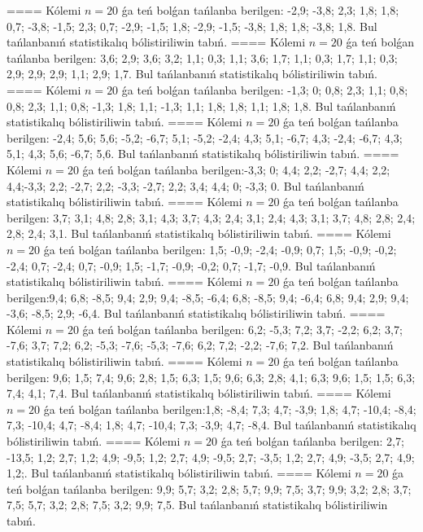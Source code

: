 ====
Kólemi \(n = 20\) ǵa teń bolǵan tańlanba berilgen: -2,9; -3,8; 2,3; 1,8; 1,8; 0,7; -3,8; -1,5; 2,3; 0,7; -2,9; -1,5; 1,8; -2,9; -1,5; -3,8; 1,8; 1,8; -3,8; 1,8. Bul tańlanbanıń statistikalıq bólistiriliwin tabıń.
====
Kólemi \(n = 20\) ǵa teń bolǵan tańlanba berilgen: 3,6; 2,9; 3,6; 3,2; 1,1; 0,3; 1,1; 3,6; 1,7; 1,1; 0,3; 1,7; 1,1; 0,3; 2,9; 2,9; 2,9; 1,1; 2,9; 1,7. Bul tańlanbanıń statistikalıq bólistiriliwin tabıń.
====
Kólemi \(n = 20\) ǵa teń bolǵan tańlanba berilgen: -1,3; 0; 0,8; 2,3; 1,1; 0,8; 0,8; 2,3; 1,1; 0,8; -1,3; 1,8; 1,1; -1,3; 1,1; 1,8; 1,8; 1,1; 1,8; 1,8. Bul tańlanbanıń statistikalıq bólistiriliwin tabıń.
====
Kólemi \(n = 20\) ǵa teń bolǵan tańlanba berilgen: -2,4; 5,6; 5,6; -5,2; -6,7; 5,1; -5,2; -2,4; 4,3; 5,1; -6,7; 4,3; -2,4; -6,7; 4,3; 5,1; 4,3; 5,6; -6,7; 5,6. Bul tańlanbanıń statistikalıq bólistiriliwin tabıń.
====
Kólemi \(n = 20\) ǵa teń bolǵan tańlanba berilgen:-3,3; 0; 4,4; 2,2; -2,7; 4,4; 2,2; 4,4;-3,3; 2,2; -2,7; 2,2; -3,3; -2,7; 2,2; 3,4; 4,4; 0; -3,3; 0. Bul tańlanbanıń statistikalıq bólistiriliwin tabıń.
====
Kólemi \(n = 20\) ǵa teń bolǵan tańlanba berilgen: 3,7; 3,1; 4,8; 2,8; 3,1; 4,3; 3,7; 4,3; 2,4; 3,1; 2,4; 4,3; 3,1; 3,7; 4,8; 2,8; 2,4; 2,8; 2,4; 3,1. Bul tańlanbanıń statistikalıq bólistiriliwin tabıń.
====
Kólemi \(n = 20\) ǵa teń bolǵan tańlanba berilgen: 1,5; -0,9; -2,4; -0,9; 0,7; 1,5; -0,9; -0,2; -2,4; 0,7; -2,4; 0,7; -0,9; 1,5; -1,7; -0,9; -0,2; 0,7; -1,7; -0,9. Bul tańlanbanıń statistikalıq bólistiriliwin tabıń.
====
Kólemi \(n = 20\) ǵa teń bolǵan tańlanba berilgen:9,4; 6,8; -8,5; 9,4; 2,9; 9,4; -8,5; -6,4; 6,8; -8,5; 9,4; -6,4; 6,8; 9,4; 2,9; 9,4; -3,6; -8,5; 2,9; -6,4. Bul tańlanbanıń statistikalıq bólistiriliwin tabıń.
====
Kólemi \(n = 20\) ǵa teń bolǵan tańlanba berilgen: 6,2; -5,3; 7,2; 3,7; -2,2; 6,2; 3,7; -7,6; 3,7; 7,2; 6,2; -5,3; -7,6; -5,3; -7,6; 6,2; 7,2; -2,2; -7,6; 7,2. Bul tańlanbanıń statistikalıq bólistiriliwin tabıń.
====
Kólemi \(n = 20\) ǵa teń bolǵan tańlanba berilgen: 9,6; 1,5; 7,4; 9,6; 2,8; 1,5; 6,3; 1,5; 9,6; 6,3; 2,8; 4,1; 6,3; 9,6; 1,5; 1,5; 6,3; 7,4; 4,1; 7,4. Bul tańlanbanıń statistikalıq bólistiriliwin tabıń.
====
Kólemi \(n = 20\) ǵa teń bolǵan tańlanba berilgen:1,8; -8,4; 7,3; 4,7; -3,9; 1,8; 4,7; -10,4; -8,4; 7,3; -10,4; 4,7; -8,4; 1,8; 4,7; -10,4; 7,3; -3,9; 4,7; -8,4. Bul tańlanbanıń statistikalıq bólistiriliwin tabıń.
====
Kólemi \(n = 20\) ǵa teń bolǵan tańlanba berilgen: 2,7; -13,5; 1,2; 2,7; 1,2; 4,9; -9,5; 1,2; 2,7; 4,9; -9,5; 2,7; -3,5; 1,2; 2,7; 4,9; -3,5; 2,7; 4,9; 1,2;. Bul tańlanbanıń statistikalıq bólistiriliwin tabıń.
====
Kólemi \(n = 20\) ǵa teń bolǵan tańlanba berilgen: 9,9; 5,7; 3,2; 2,8; 5,7; 9,9; 7,5; 3,7; 9,9; 3,2; 2,8; 3,7; 7,5; 5,7; 3,2; 2,8; 7,5; 3,2; 9,9; 7,5. Bul tańlanbanıń statistikalıq bólistiriliwin tabıń.
